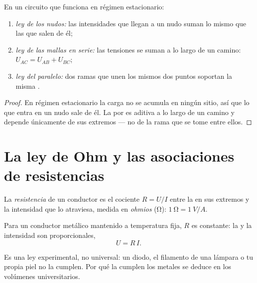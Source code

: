 \begin{proposition}\label{prop:g11:circuits-and-power:laws}
En un circuito que funciona en régimen estacionario:
\begin{enumerate}
  \item \emph{ley de los nudos:} las intensidades que llegan a un nudo
        suman lo mismo que las que salen de él;
  \item \emph{ley de las mallas en serie:} las tensiones se suman a lo
        largo de un camino: $U_{AC} = U_{AB} + U_{BC}$;
  \item \emph{ley del paralelo:} dos ramas que unen los mismos dos
        puntos soportan la misma .
\end{enumerate}
\end{proposition}

\begin{proof}
En régimen estacionario la carga no se acumula en ningún sitio, así que
lo que entra en un nudo sale de él. La  por  es aditiva a
lo largo de un camino y depende únicamente de sus extremos --- no de la
rama que se tome entre ellos.
\end{proof}

\section{La ley de Ohm y las asociaciones de resistencias}

\begin{definition}[Resistencia]\label{def:g11:circuits-and-power:resistance}
La \emph{resistencia} de un conductor es el cociente
$R = U/I$ entre la  en sus extremos y la intensidad que lo
atraviesa, medida en \emph{ohmios} (\unit{\ohm}):
$\qty{1}{\ohm} = \qty{1}{V/A}$.
\end{definition}

\begin{proposition}\label{prop:g11:circuits-and-power:ohm}
Para un conductor metálico mantenido a temperatura fija, $R$ es
constante: la  y la intensidad son proporcionales,
\[ U = R\,I . \]
\end{proposition}
\admitted

\begin{remark}\label{rem:g11:circuits-and-power:ohm-limits}
Es una ley experimental, no universal: un diodo, el filamento de una
lámpara o tu propia piel no la cumplen. Por qué la cumplen los metales
se deduce en los volúmenes universitarios.
\end{remark}

